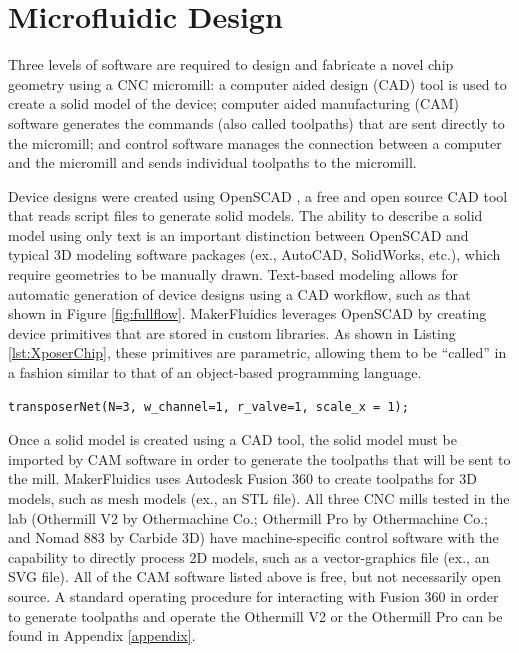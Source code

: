 \section{Microfluidic Design}
\label{sec:mfDesign}

Three levels of software are required to design and fabricate a novel chip geometry using a CNC micromill: a computer aided design (CAD) tool is used to create a solid model of the device; computer aided manufacturing (CAM) software generates the commands (also called toolpaths) that are sent directly to the micromill; and control software manages the connection between a computer and the micromill and sends individual toolpaths to the micromill. 

Device designs were created using OpenSCAD \cite{wikiOpenScad}, a free and open source CAD tool that reads script files to generate solid models. The ability to describe a solid model using only text is an important distinction between OpenSCAD and typical 3D modeling software packages (ex., AutoCAD, SolidWorks, etc.), which require geometries to be manually drawn. Text-based modeling allows for automatic generation of device designs using a CAD workflow, such as that shown in Figure \ref{fig:fullflow}. MakerFluidics leverages OpenSCAD by creating device primitives that are stored in custom libraries. As shown in Listing \ref{lst:XposerChip}, these primitives are parametric, allowing them to be ``called'' in a fashion similar to that of an object-based programming language. 

\begin{minipage}{0.95\linewidth}
\centering 
	\begin{lstlisting}[caption={This single line of OpenSCAD creates the 3D model shown in Figure \ref{fig:mfParams}(A). Once a primitive is defined in OpenSCAD, the parameters associated with each device geometry can be modified and the corresponding solid model will adjust to reflect the changes.},label={lst:XposerChip}, frame=single, language=scad]
  transposerNet(N=3, w_channel=1, r_valve=1, scale_x = 1);
\end{lstlisting}
\end{minipage}

Once a solid model is created using a CAD tool, the solid model must be imported by CAM software in order to generate the toolpaths that will be sent to the mill. MakerFluidics uses Autodesk Fusion 360 to create toolpaths for 3D models, such as mesh models (ex., an STL file). All three CNC mills tested in the lab (Othermill V2 by Othermachine Co.; Othermill Pro by Othermachine Co.; and Nomad 883 by Carbide 3D) have machine-specific control software with the capability to directly process 2D models, such as a vector-graphics file (ex., an SVG file). All of the CAM software listed above is free, but not necessarily open source. A standard operating procedure for interacting with Fusion 360 in order to generate toolpaths and operate the Othermill V2 or the Othermill Pro can be found in Appendix \ref{appendix}.


